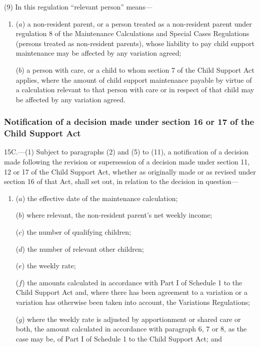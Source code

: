\documentclass[12pt,a4paper]{article}
\begin{document}
{(9) In this regulation “relevant person” means—
\begin{enumerate}\item[]
($a$) a non-resident parent, or a person treated as a non-resident parent under regulation 8 of the Maintenance Calculations and Special Cases Regulations (persons treated as non-resident parents), whose liability to pay child support maintenance may be affected by any variation agreed;

($b$) a person with care, or a child to whom section 7 of the Child Support Act applies, where the amount of child support maintenance payable by virtue of a calculation relevant to that person with care or in respect of that child may be affected by any variation agreed.
\end{enumerate}


\subsubsection[15C. Notification of a decision made under section 16 or 17 of the Child Support Act]{Notification of a decision made under section 16 or 17 of the Child Support Act}

15C.---(1)  Subject to paragraphs (2) and (5) to (11), a notification of a decision made following the revision or supersession of a decision made under section 11, 12 or 17 of the Child Support Act, whether as originally made or as revised under section 16 of that Act, shall set out, in relation to the decision in question—
\begin{enumerate}\item[]
($a$) the effective date of the maintenance calculation;

($b$) where relevant, the non-resident parent’s net weekly income;

($c$) the number of qualifying children;

($d$) the number of relevant other children;

($e$) the weekly rate;

($f$) the amounts calculated in accordance with Part I of Schedule 1 to the Child Support Act and, where there has been agreement to a variation or a variation has otherwise been taken into account, the Variations Regulations;

($g$) where the weekly rate is adjusted by apportionment or shared care or both, the amount calculated in accordance with paragraph 6, 7 or 8, as the case may be, of Part I of Schedule 1 to the Child Support Act; and


\end{enumerate}}
\end{document}
